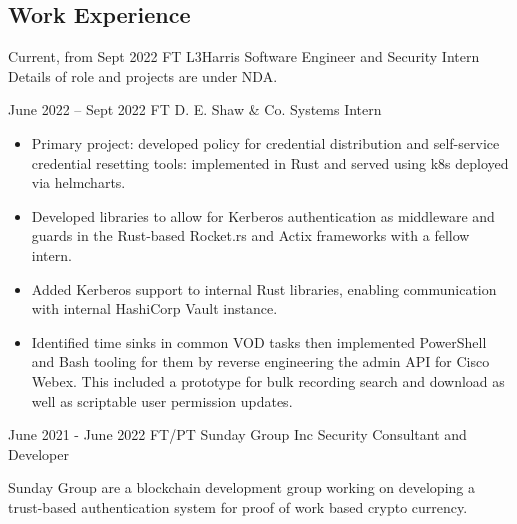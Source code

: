 \documentclass[
	9pt, %
]{FreemanCV}
\begin{document}
\begin{paracol}{2}
\section{Work Experience}





\jobentry
	{Current, from Sept 2022} %
	{FT} %
	{L3Harris} %
	{Software Engineer and Security Intern} %
	{Details of role and projects are under NDA.} %


\jobentry
	{June 2022 -- Sept 2022} %
	{FT} %
	{D. E. Shaw \& Co.} %
	{Systems Intern} %
	{\begin{itemize}[noitemsep, topsep=0pt, partopsep=0pt, leftmargin=8pt, before =\leavevmode\vspace*{-\baselineskip}]
			\item Primary project: developed policy for credential distribution and self-service credential resetting tools: implemented in Rust and served using k8s deployed via helmcharts.
			\item Developed libraries to allow for Kerberos authentication as middleware and guards in the Rust-based Rocket.rs and Actix frameworks with a fellow intern.
			\item  Added Kerberos support to internal Rust libraries, enabling communication with internal HashiCorp Vault instance. 
			\item Identified time sinks in common VOD tasks then implemented 
			PowerShell and Bash tooling for them by reverse engineering the admin API for Cisco Webex. 
			This included a prototype for bulk recording search and download as well as scriptable user permission updates. 
	\end{itemize}} %

\jobentry
	{June 2021 - June 2022} %
	{FT/PT} %
	{Sunday Group Inc} %
	{Security Consultant and Developer} %
	{Sunday Group are a blockchain development group working on developing a trust-based authentication 
	system for proof of work based crypto currency. 
	\medspace

}
\end{paracol}
\end{document}
